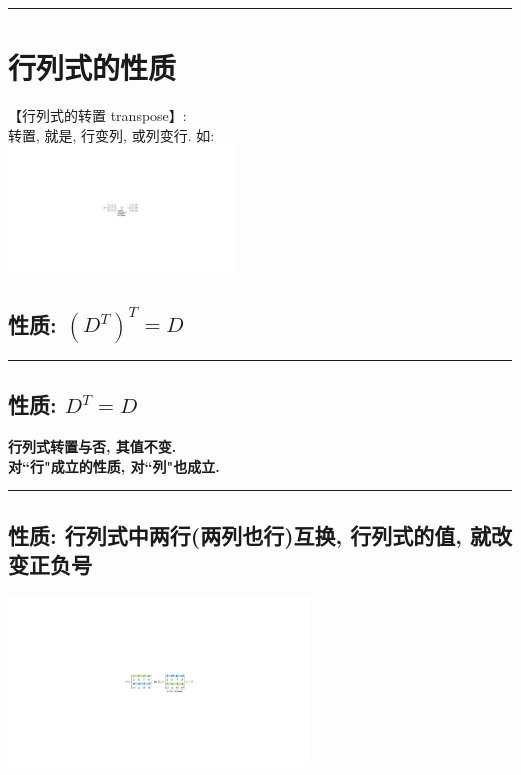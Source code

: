 \documentclass[UTF8]{ctexart}
\begin{document}
\hrule

	
	
	\section{行列式的性质}
	
	【行列式的转置 transpose】:\\
	转置, 就是, 行变列, 或列变行. 如:\\
	\includegraphics[width=0.45\textwidth]{img/0007.pdf}\\
	
	
	
	\subsection{性质: $\left( D^T \right) ^T=D$	}
	
	
	\hrule
	
	\subsection{性质: $D^T=D$ }
	\textbf{行列式转置与否, 其值不变.} \\
	\textbf{对``行"成立的性质, 对``列"也成立.} \\
	
\hrule
	
	\subsection{性质: 行列式中两行(两列也行)互换, 行列式的值, 就改变正负号 }
	
	\includegraphics[width=0.6\textwidth]{img/0008.pdf}\\
	
\end{document}
